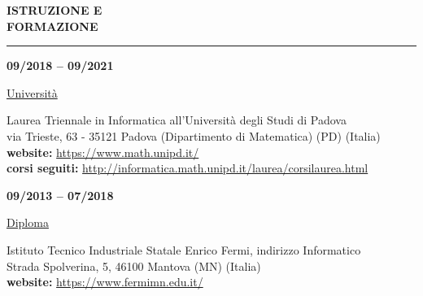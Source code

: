 \begin{minipage}[b]{0.3\textwidth}
	\textbf{ISTRUZIONE E \\FORMAZIONE}
\end{minipage}%
\hfill
\hfill
\begin{minipage}[t]{0.6\textwidth}		
	\rule{\textwidth}{0.4pt}
\end{minipage}%
\vspace{5mm}



\begin{minipage}[t]{0.3\textwidth}
	\textbf{09/2018 – 09/2021}
\end{minipage}%
\hfill
\hfill
\begin{minipage}[t]{0.6\textwidth}		
	\begin{Large}
		\underline{Università} \vspace{5mm}\\
	\end{Large}
	Laurea Triennale in Informatica all'Università degli Studi di Padova\\
	via Trieste, 63 - 35121 Padova (Dipartimento di Matematica) (PD) (Italia) \\
	\textbf{website:} \url{https://www.math.unipd.it/}\\
	\textbf{corsi seguiti:} \url{http://informatica.math.unipd.it/laurea/corsilaurea.html}\\
	\vspace{4mm}
\end{minipage}%


\begin{minipage}[t]{0.3\textwidth}
	\textbf{09/2013 – 07/2018}
\end{minipage}%
\hfill
\hfill
\begin{minipage}[t]{0.6\textwidth}		
	\begin{Large}
		\underline{Diploma} \vspace{5mm}\\
	\end{Large}
	Istituto Tecnico Industriale Statale Enrico Fermi, indirizzo Informatico\\
	Strada Spolverina, 5, 46100 Mantova (MN) (Italia) \\
	\textbf{website:} \url{https://www.fermimn.edu.it/} \vspace{1mm}\\
	\vspace{4mm}
\end{minipage}%